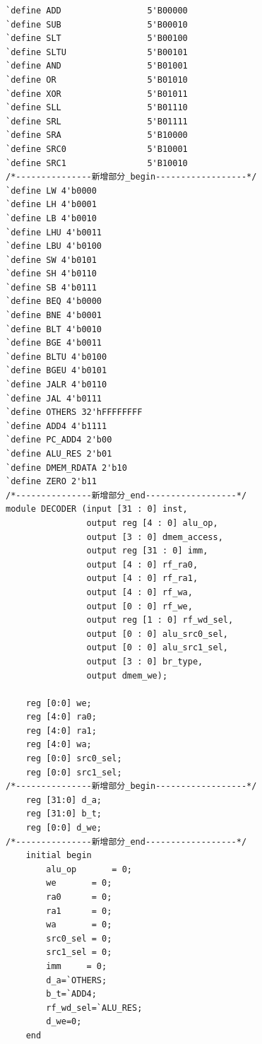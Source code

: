 \documentclass[12pt,a4paper]{ctexart}
\begin{document}
\begin{lstlisting}[style=verilog]
`define ADD                 5'B00000
`define SUB                 5'B00010
`define SLT                 5'B00100
`define SLTU                5'B00101
`define AND                 5'B01001
`define OR                  5'B01010
`define XOR                 5'B01011
`define SLL                 5'B01110
`define SRL                 5'B01111
`define SRA                 5'B10000
`define SRC0                5'B10001
`define SRC1                5'B10010
/*---------------新增部分_begin------------------*/
`define LW 4'b0000
`define LH 4'b0001
`define LB 4'b0010
`define LHU 4'b0011
`define LBU 4'b0100
`define SW 4'b0101
`define SH 4'b0110
`define SB 4'b0111
`define BEQ 4'b0000
`define BNE 4'b0001
`define BLT 4'b0010
`define BGE 4'b0011
`define BLTU 4'b0100
`define BGEU 4'b0101
`define JALR 4'b0110
`define JAL 4'b0111
`define OTHERS 32'hFFFFFFFF
`define ADD4 4'b1111
`define PC_ADD4 2'b00
`define ALU_RES 2'b01
`define DMEM_RDATA 2'b10
`define ZERO 2'b11
/*---------------新增部分_end------------------*/
module DECODER (input [31 : 0] inst,
                output reg [4 : 0] alu_op,
                output [3 : 0] dmem_access,
                output reg [31 : 0] imm,
                output [4 : 0] rf_ra0,
                output [4 : 0] rf_ra1,
                output [4 : 0] rf_wa,
                output [0 : 0] rf_we,
                output reg [1 : 0] rf_wd_sel,
                output [0 : 0] alu_src0_sel,
                output [0 : 0] alu_src1_sel,
                output [3 : 0] br_type,
                output dmem_we);
    
    reg [0:0] we;
    reg [4:0] ra0;
    reg [4:0] ra1;
    reg [4:0] wa;
    reg [0:0] src0_sel;
    reg [0:0] src1_sel;
/*---------------新增部分_begin------------------*/
    reg [31:0] d_a;
    reg [31:0] b_t;
    reg [0:0] d_we;
/*---------------新增部分_end------------------*/
    initial begin
        alu_op       = 0;
        we       = 0;
        ra0      = 0;
        ra1      = 0;
        wa       = 0;
        src0_sel = 0;
        src1_sel = 0;
        imm     = 0;
        d_a=`OTHERS;
        b_t=`ADD4;
        rf_wd_sel=`ALU_RES;
        d_we=0;
    end
    

\end{lstlisting}
\end{document}

